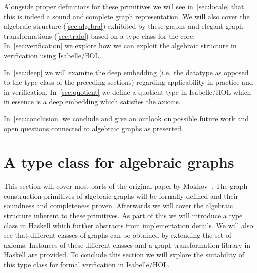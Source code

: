 \documentclass{article}
\begin{document}
Alongside proper definitions for these primitives we will see
in~\autoref{sec:locale} that this is indeed a sound and complete graph
representation. We will also cover the algebraic structure (\ref{sec:algebra})
exhibited by these graphs and elegant graph transformations (\ref{sec:trafo})
based on a type class for the core. In~\autoref{sec:verification} we explore how
we can exploit the algebraic structure in verification using Isabelle/HOL.

In~\autoref{sec:deep} we will examine the deep embedding (i.e.\
the datatype as opposed to the type class of the preceding sections) regarding
applicability in practice and in verification. In~\autoref{sec:quotient} we
define a quotient type in Isabelle/HOL which in essence is a deep embedding
which satisfies the axioms.

In~\autoref{sec:conclusion} we conclude and give an outlook on possible future
work and open questions connected to algebraic graphs as presented.

\section{A type class for algebraic graphs}\label{sec:locale}
This section will cover most parts of the original paper by
Mokhov~\cite{mokhov2017algebraic}. The graph construction primitives of
algebraic graphs will be formally defined and their soundness and completeness
proven. Afterwards we will cover the algebraic structure inherent to these
primitives. As part of this we will introduce a type class in Haskell which
further abstracts from implementation details. We will also see that different
classes of graphs can be obtained by extending the set of axioms. Instances of
these different classes and a graph transformation library in Haskell are
provided. To conclude this section we will explore the suitability of this type
class for formal verification in Isabelle/HOL.
\end{document}
